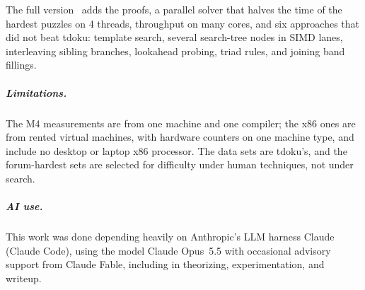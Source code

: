 \documentclass[a4paper,USenglish,cleveref,anonymous]{lipics-v2021}
\newif\ifanon
\newcommand{\selfcite}[1]{\ifanon[anonymized]\else\cite{#1}\fi}
\begin{document}
The full version~\selfcite{kelly2026full} adds the proofs, a parallel solver that halves the time of the hardest puzzles
on 4 threads, throughput on many cores, and six approaches that did not beat tdoku: template search, several
search-tree nodes in SIMD lanes, interleaving sibling branches, lookahead probing, triad rules, and joining band
fillings.

\subparagraph{Limitations.} The M4 measurements are from one machine and one compiler; the x86 ones are from rented
virtual machines, with hardware counters on one machine type, and include no desktop or laptop x86 processor. The data
sets are tdoku's, and the forum-hardest sets are selected for difficulty under human techniques, not under search.

\subparagraph{AI use.} This work was done depending heavily on Anthropic's LLM harness Claude (Claude Code), using the model Claude Opus~5.5 with occasional advisory support from Claude Fable, including in theorizing, experimentation, and writeup.



\end{document}
